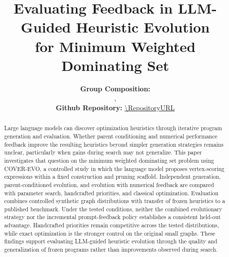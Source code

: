 \documentclass[10pt,a4paper,twocolumn]{article}
\title{
    Evaluating Feedback in LLM-Guided Heuristic Evolution\\
    \large for Minimum Weighted Dominating Set
}
\author{\normalsize{\bf Group Composition:}\\
\normalsize \AuthorNames, \StudentIDs\\[4pt]
\normalsize{\bf Github Repository:} \expandafter\url\expandafter{\RepositoryURL}}
\date{}
\begin{document}
\maketitle
\vspace{-2em}

\begin{abstract}
Large language models can discover optimization heuristics through iterative
program generation and evaluation. Whether parent conditioning and numerical
performance feedback improve the resulting heuristics beyond simpler
generation strategies remains unclear, particularly when gains during search
may not generalize. This paper investigates that question on the minimum
weighted dominating set problem using COVER-EVO, a controlled study in which
the language model proposes vertex-scoring expressions within a fixed
construction and pruning scaffold. Independent generation, parent-conditioned
evolution, and evolution with numerical feedback are compared with parameter
search, handcrafted priorities, and classical optimization. Evaluation combines
controlled synthetic graph distributions with transfer of frozen heuristics
to a published benchmark. Under the tested conditions, neither the combined
evolutionary strategy nor the incremental prompt-feedback policy establishes
a consistent held-out advantage. Handcrafted priorities remain competitive across the tested distributions,
while exact optimization is the stronger control on the original small graphs. These findings support
evaluating LLM-guided heuristic evolution through the quality and
generalization of frozen programs rather than improvements observed during search.
\end{abstract}






\begingroup\raggedright{}
\balance


\endgroup
\end{document}
